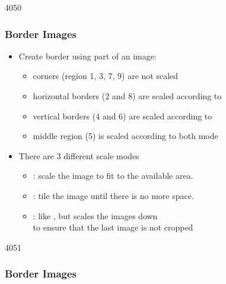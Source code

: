 \begin{slide}{4050}\frametitle{Border Images}


\begin{itemize}
\item Create border using part of an image:
  \begin{itemize}
  \item corners (region 1, 3, 7, 9) are not scaled
  \item horizontal borders (2 and 8) are scaled according to 
  \item vertical borders (4 and 6) are scaled according to 
  \item middle region (5) is scaled according to both mode
  \end{itemize}
\item There are 3 different scale modes
  \begin{itemize}
  \item {}: scale the image to fit to the available area.
  \item {}: tile the image until there is no more space.
  \item {}: like , but scales the images down\\
    to ensure that the last image is not cropped
  \end{itemize}
\end{itemize}

\end{slide}


\begin{slide}{4051}\frametitle{Border Images}


\begin{qml}
\\
\\
\\
\\
\\
\\
\qtt{\}}
\end{qml}


\end{slide}
